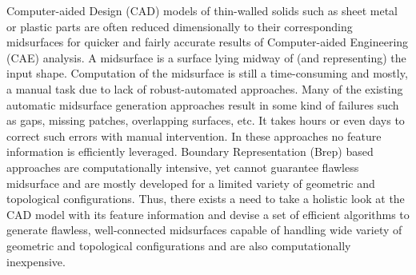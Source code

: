 

Computer-aided Design (CAD) models of thin-walled solids such as sheet metal or plastic parts are often reduced dimensionally to their corresponding midsurfaces for quicker and fairly accurate results of Computer-aided Engineering (CAE) analysis.  A midsurface is a surface lying midway of (and representing) the input shape.  Computation of the midsurface is still a time-consuming and mostly, a manual task due to lack of robust-automated approaches. Many of the existing automatic midsurface generation approaches result in some kind of failures such as gaps, missing patches, overlapping surfaces, etc. It takes hours or even days to correct such errors with manual intervention. In these approaches no feature information is efficiently leveraged. Boundary Representation (Brep) based approaches are computationally intensive, yet cannot guarantee flawless midsurface and are mostly developed for a limited variety of geometric and topological configurations. Thus, there exists a need to take a holistic look at the CAD model with its feature information and devise a set of efficient algorithms to generate flawless, well-connected midsurfaces capable of handling wide variety of geometric and topological configurations and are also computationally inexpensive. %


